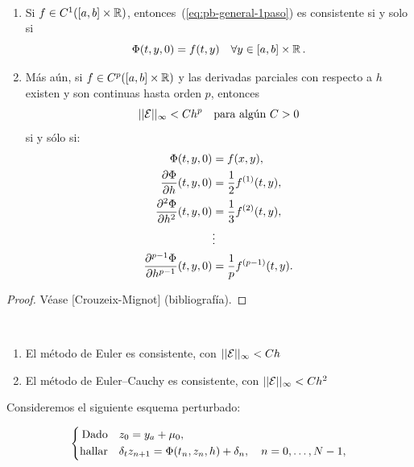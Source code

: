 \begin{theorem}[Consistencia]~
  \label{thm:consitencia-pb-general-1paso}
  \begin{enumerate}
  \item Si $f\in C^1([\ta,\tb]\times\Rset)$,
    entonces~(\ref{eq:pb-general-1paso}) es consistente si y solo si 
    \begin{equation*}
      \Phi(t,y,0) = f(t,y)\quad \forall y\in[\ta,\tb]\times\Rset.
    \end{equation*}
  \item Más aún, si $f\in C^p([\ta,\tb]\times\Rset)$ y las derivadas
    parciales con respecto a $h$ existen y son continuas hasta orden
    $p$, entonces
    $$ ||{\cal E}||_\infty<C h^p \quad \text{para algún $C>0$}$$
    si y sólo si:
    \begin{align*}
      \Phi(t,y,0) &= f(x,y), \\
      \frac{\partial\Phi}{\partial h}(t,y,0) &=
      \frac{1}{2}\Dtotal1 f(t,y),
      \\
      \frac{\partial^2\Phi}{\partial h^2}(t,y,0) &=
      \frac{1}{3}\Dtotal2 f(t,y),
      \\
      &\vdots
      \\
      \frac{\partial^{p-1}\Phi}{\partial h^{p-1}}(t,y,0) &=
      \frac{1}{p} \Dtotal{p-1} f(t,y).
    \end{align*}
  \end{enumerate}
\end{theorem}

\begin{proof}
  Véase [Crouzeix-Mignot] (bibliografía).
\end{proof}

\begin{example}~
  \begin{enumerate}
  \item 
    El método de Euler es consistente, con  $ ||{\cal E}||_\infty<C h $
  \item El método de Euler--Cauchy es consistente, con $ ||{\cal
      E}||_\infty<C h^2 $
  \end{enumerate}
\end{example}

Consideremos el siguiente esquema perturbado:

\begin{equation}
  \label{eq:pb-perturbado-general-1paso} 
  \left\{
  \begin{aligned}
    \text{Dado}\quad &z_0 = \ycero+\mu_0,\\
    \text{hallar}\quad &\ddt z_{n+1} = \Phi(\tn,z_n, h) + \delta_n, \quad
    n=0,\dots, N-1,
  \end{aligned}
  \right.
\end{equation}

